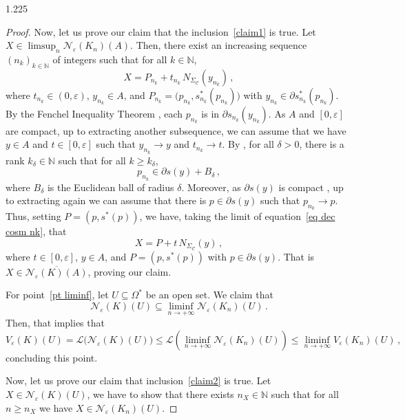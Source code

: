 \documentclass[reqno, a4paper]{amsart}
\numberwithin{equation}{section}
\numberwithin{figure}{section}
\theoremstyle{definition}
\theoremstyle{remark}
\newcommand{\N}{\mathbb{N}} %
\newcommand{\C}{\mathcal{C}} %
\renewcommand{\S}{\Sigma_\C} %
\newcommand{\vp}[1]{{\left( {#1} \right)}} %
\newcommand{\bp}[1]{{\bigl( {#1} \bigr)}} %
\begin{document}
\begin{spacing}{1.225}
\begin{proof}
Now, let us prove our claim that the inclusion~\eqref{claim1} is true. Let $X \in \limsup_n \mathcal{N}_\varepsilon(K_n)(A)$. Then, there exist an increasing sequence $(n_k)_{k \in \N}$ of integers such that for all $k\in \N$,
\begin{equation}
\label{eq dec cosm nk}
 X = P_{n_k} + t_{n_k} \, N_{\S}(y_{n_k}) \, ,
\end{equation}
where $t_{n_k}\in (0,\varepsilon)$, $y_{n_k} \in A$, and $P_{n_k} = \bp{p_{n_k},s_{n_k}^*(p_{n_k})}$ with $y_{n_k} \in \partial s^*_{n_k}(p_{n_k})$. By the Fenchel Inequality Theorem \cite[Theorem~23.5]{Rockafellar_97}, each $p_{n_k}$ is in $\partial s_{n_k}(y_{n_k})$. As $A$ and $[0,\varepsilon]$ are compact, up to extracting another subsequence, we can assume that we have $y \in A$ and $t \in [0,\varepsilon]$ such that $y_{n_k} \xrightarrow[]{} y$ and $ t_{n_k} \to t$. By \cite[Theorem~24.5]{Rockafellar_97}, for all $\delta>0$, there is a rank $k_\delta \in \N$ such that for all $k\geq k_\delta$, 
\begin{equation*}
 p_{n_k} \in \partial s(y) + B_\delta \, ,
\end{equation*}
where $B_\delta$ is the Euclidean ball of radius $\delta$. Moreover, as $\partial s(y)$ is compact \cite[Theorem~A.22]{Figalli_17}, up to extracting again we can assume that there is $p \in \partial s(y)$ such that $p_{n_k} \to p$. Thus, setting $P = (p,s^*(p))$, we have, taking the limit of equation~\eqref{eq dec cosm nk}, that 
\begin{equation*}
 X = P + t \, N_{\S}(y) \, ,
\end{equation*} 
where $t\in [0,\varepsilon]$, $y \in A$, and $P = (p,s^*(p))$ with $p \in \partial s(y)$. That is $X \in \overline{\mathcal{N}_\varepsilon(K)(A)}$, proving our claim. 

For point~\ref{pt liminf}, let $U\subseteq\Omega^*$ be an open set. 
We claim that
\begin{equation}
\label{claim2}
 \mathcal{N}_\varepsilon(K)(U) \subseteq \liminf_{n\to +\infty} \mathcal{N}_\varepsilon(K_n)(U) \, . 
\end{equation}
Then, that implies that 
\begin{equation*}
 V_\varepsilon(K)(U) = \mathcal{L}\bp{\mathcal{N}_\varepsilon(K)(U)} \leq \mathcal{L}\vp{\liminf_{n\to+\infty} \mathcal{N}_\varepsilon(K_n)(U)} \leq \liminf_{n\to+\infty} V_\varepsilon(K_n)(U) \, ,
\end{equation*}
concluding this point. 

Now, let us prove our claim that inclusion~\eqref{claim2} is true. Let $X \in \mathcal{N}_\varepsilon(K)(U)$, we have to show that there exists $n_{X} \in \N$ such that for all $n \geq n_{X}$ we have $X \in \mathcal{N}_\varepsilon(K_n)(U)$. 


\end{proof}
\end{spacing}
\end{document}
